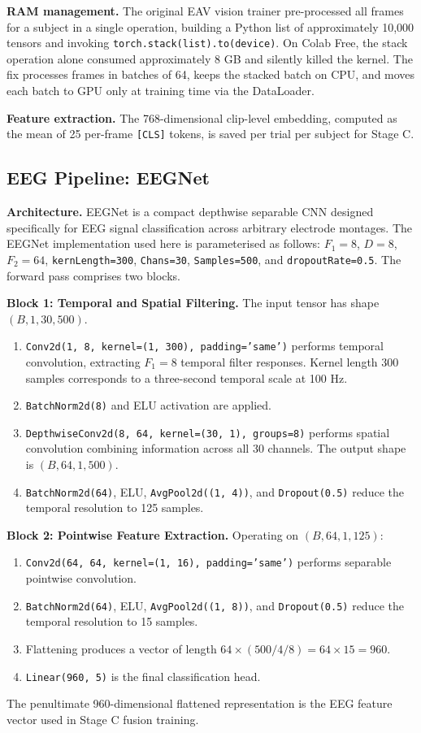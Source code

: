 \textbf{RAM management.} The original EAV vision trainer pre-processed all frames for a subject in a single operation, building a Python list of approximately 10,000 tensors and invoking \texttt{torch.stack(list).to(device)}. On Colab Free, the stack operation alone consumed approximately 8 GB and silently killed the kernel. The fix processes frames in batches of 64, keeps the stacked batch on CPU, and moves each batch to GPU only at training time via the DataLoader.

\textbf{Feature extraction.} The 768-dimensional clip-level embedding, computed as the mean of 25 per-frame \texttt{[CLS]} tokens, is saved per trial per subject for Stage C.

\subsection{EEG Pipeline: EEGNet}
\textbf{Architecture.} EEGNet \cite{Lawhern2018EEGNet} is a compact depthwise separable CNN designed specifically for EEG signal classification across arbitrary electrode montages. The EEGNet implementation used here is parameterised as follows: $F_1=8$, $D=8$, $F_2=64$, \texttt{kernLength=300}, \texttt{Chans=30}, \texttt{Samples=500}, and \texttt{dropoutRate=0.5}. The forward pass comprises two blocks.

\textbf{Block 1: Temporal and Spatial Filtering.} The input tensor has shape $(B, 1, 30, 500)$.
\begin{enumerate}
    \item \texttt{Conv2d(1, 8, kernel=(1, 300), padding='same')} performs temporal convolution, extracting $F_1=8$ temporal filter responses. Kernel length 300 samples corresponds to a three-second temporal scale at 100 Hz.
    \item \texttt{BatchNorm2d(8)} and ELU activation are applied.
    \item \texttt{DepthwiseConv2d(8, 64, kernel=(30, 1), groups=8)} performs spatial convolution combining information across all 30 channels. The output shape is $(B, 64, 1, 500)$.
    \item \texttt{BatchNorm2d(64)}, ELU, \texttt{AvgPool2d((1, 4))}, and \texttt{Dropout(0.5)} reduce the temporal resolution to 125 samples.
\end{enumerate}

\textbf{Block 2: Pointwise Feature Extraction.} Operating on $(B, 64, 1, 125)$:
\begin{enumerate}
    \item \texttt{Conv2d(64, 64, kernel=(1, 16), padding='same')} performs separable pointwise convolution.
    \item \texttt{BatchNorm2d(64)}, ELU, \texttt{AvgPool2d((1, 8))}, and \texttt{Dropout(0.5)} reduce the temporal resolution to 15 samples.
    \item Flattening produces a vector of length $64\times(500/4/8)=64\times15=960$.
    \item \texttt{Linear(960, 5)} is the final classification head.
\end{enumerate}
The penultimate 960-dimensional flattened representation is the EEG feature vector used in Stage C fusion training.

